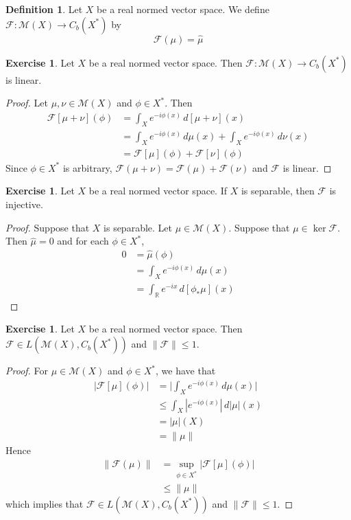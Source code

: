 \documentclass{book}
\theoremstyle{definition}
\newtheorem{defn}[definition]{Definition}
\newtheorem{ex}[definition]{Exercise}
\newcommand{\R}{\mathbb{R}}
\newcommand{\MF}{\mathcal{F}}
\newcommand{\MM}{\mathcal{M}}
\DeclareMathOperator*{\0}{\mbf{0}}
\DeclareMathOperator*{\1}{\mbf{1}}
\newcommand{\dmu}{\, d \mu}
\newcommand{\dnu}{\, d \nu}
\begin{document}
	\begin{defn}
		Let $X$ be a real normed vector space. We define $\MF: \MM(X) \rightarrow C_b(X^*)$ by $$\MF(\mu) = \hat{\mu}$$
	\end{defn}
	
	\begin{ex}
		Let $X$ be a real normed vector space. Then $\MF: \MM(X) \rightarrow C_b(X^*)$ is linear.
	\end{ex}
	
	\begin{proof}
		Let $\mu, \nu \in \MM(X)$ and $\phi \in X^*$. Then 
		\begin{align*}
			\MF[\mu + \nu](\phi) 
			& = \int_X e^{-i \phi(x)} \, d[\mu + \nu](x) \\
			& = \int_X e^{-i \phi(x)} \dmu(x) + \int_X e^{-i \phi(x)} \dnu(x) \\
			& = \MF[\mu](\phi) + \MF[\nu](\phi) 
		\end{align*}
		Since $\phi \in X^*$ is arbitrary, $\MF(\mu + \nu) = \MF(\mu) + \MF(\nu)$ and $\MF$ is linear.
	\end{proof}
	
	\begin{ex}
		Let $X$ be a real normed vector space. If $X$ is separable, then $\MF$ is injective.  
	\end{ex}
	
	\begin{proof}
		Suppose that $X$ is separable. Let $\mu \in \MM(X)$. Suppose that $\mu \in \ker \MF$. Then $\hat{\mu} =0$ and for each $\phi \in X^*$, 
		\begin{align*}
			0 
			& = \hat{\mu}(\phi) \\
			& = \int_X e^{-i \phi(x)} \dmu(x) \\
			& = \int_{\R} e^{-ix} \, d[\phi_*\mu](x)
		\end{align*}
	\end{proof}
	
	\begin{ex}
		Let $X$ be a real normed vector space. Then $\MF \in L(\MM(X), C_b(X^*))$ and $\|\MF\| \leq 1$.
	\end{ex}
	
	\begin{proof}
		For $\mu \in \MM(X)$ and $\phi \in X^*$, we have that 
		\begin{align*}
			|\MF[\mu](\phi)|
			& =  \bigg| \int_X e^{-i \phi(x)} \dmu(x) \bigg| \\
			& \leq \int_X |e^{-i \phi(x)}| \, d|\mu|(x) \\
			& = |\mu|(X) \\
			& = \|\mu\|
		\end{align*}
		Hence 
		\begin{align*}
			\|\MF(\mu)\| 
			& = \sup_{\phi \in X^*} |\MF[\mu](\phi)| \\
			& \leq \|\mu\|
		\end{align*}
		which implies that $\MF \in L(\MM(X), C_b(X^*))$ and $\|\MF\| \leq 1$.
	\end{proof}
	
\end{document}
